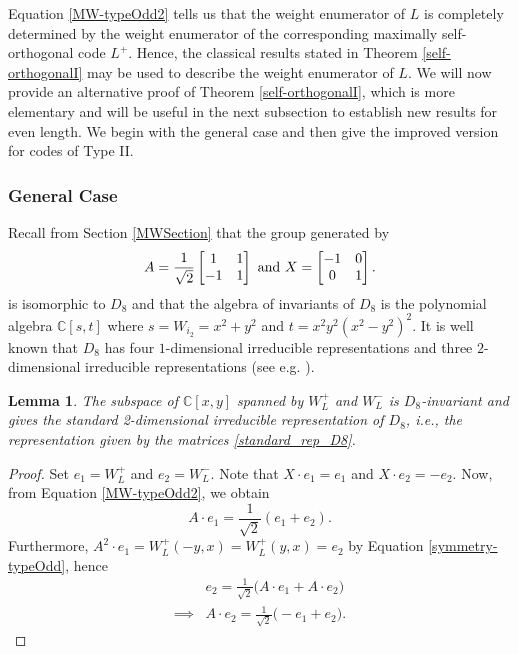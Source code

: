 \documentclass[a4paper,reqno]{amsart}
\newtheorem{lemma}[theorem]{Lemma}
\theoremstyle{definition}
\theoremstyle{remark} \newtheorem{remark}[theorem]{Remark}
\numberwithin{equation}{section}
\begin{document}
Equation \eqref{MW-typeOdd2} tells us that the weight enumerator of \(L\) is completely determined by the weight enumerator of the corresponding maximally self-orthogonal code \(L^+\). Hence, the classical results stated in Theorem \ref{self-orthogonalI} may be used to describe the weight enumerator of \(L\). We will now provide an alternative proof of Theorem \ref{self-orthogonalI}, which is more elementary and will be useful in the next subsection to establish new results for even length.  We begin with the general case and then give the improved version for codes of Type II.

\subsubsection{General Case}\label{AltProofI} Recall from Section \ref{MWSection} that the group generated by 
\begin{equation}\label{standard_rep_D8}
    A = \frac{1}{\sqrt{2}}
    \begin{bmatrix}
        1 & 1 \\
        -1 & 1
    \end{bmatrix}
    \textnormal{ and }
    X = 
    \begin{bmatrix}
        -1 & 0 \\
        0 & 1
    \end{bmatrix}.
\end{equation}
is isomorphic to \(D_8\) and that the algebra of invariants of \(D_8\) is the polynomial algebra \(\mathbb{C}[s,t]\) where \(s = W_{i_2} = x^2 + y^2\) and \(t = x^2y^2(x^2-y^2)^2\). It is well known that \(D_8\) has four \(1\)-dimensional irreducible representations and three \(2\)-dimensional irreducible representations (see e.g. \cite[\S18.3]{JL1993}). %

\begin{lemma}\label{D8representationOdd}
    The subspace of \(\mathbb{C}[x,y]\) spanned by \(W_L^+\) and \(W_L^-\) is \(D_8\)-invariant and gives the standard 2-dimensional irreducible representation of \(D_8\), i.e., the representation given by the matrices \eqref{standard_rep_D8}.
\end{lemma}

\begin{proof}
Set \(e_1 = W_L^+\) and \(e_2 = W_L^-\). Note that \(X \cdot e_1 = e_1\) and \(X \cdot e_2 = -e_2\). Now, from Equation \eqref{MW-typeOdd2}, we obtain
\begin{equation*}
    A \cdot e_1 = \frac{1}{\sqrt{2}}(e_1 + e_2).
\end{equation*}
Furthermore, \(A^2 \cdot e_1 = W^+_L(-y,x) = W^+_L(y,x) = e_2\) by Equation \eqref{symmetry-typeOdd}, hence 
\begin{align*}
    & e_2 = \frac{1}{\sqrt{2}}\bigl(A\cdot e_1 + A\cdot e_2\bigr) \\
    \implies &A\cdot e_2 = \frac{1}{\sqrt{2}} \bigl(-e_1 + e_2\bigr).
\end{align*}
\end{proof}
\end{document}
